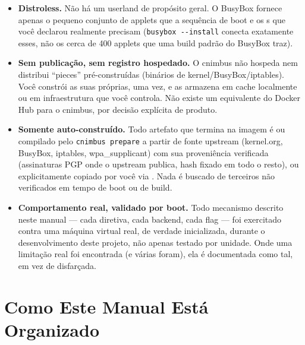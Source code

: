 \documentclass[11pt,letterpaper]{report}
\newcommand{\dashfix}[1]{\StrSubstitute{#1}{--}{-{}-}}
\newcommand{\dir}[1]{\texttt{\textbf{\dashfix{#1}}}}
\begin{document}
\begin{itemize}
  \item \textbf{Distroless.} Não há um userland de propósito geral.
    O BusyBox fornece apenas o pequeno conjunto de applets que a
    sequência de boot e os \dir{SERVICE}s que você declarou realmente
    precisam (\texttt{busybox -{}-install} conecta exatamente esses,
    não os cerca de 400 applets que uma build padrão do BusyBox traz).
  \item \textbf{Sem publicação, sem registro hospedado.} O cnimbus não
    hospeda nem distribui ``pieces'' pré-construídas (binários de
    kernel/BusyBox/iptables). Você constrói as suas próprias, uma vez,
    e as armazena em cache localmente ou em infraestrutura que você
    controla. Não existe um equivalente do Docker Hub para o cnimbus,
    por decisão explícita de produto.
  \item \textbf{Somente auto-construído.} Todo artefato que termina na
    imagem é ou compilado pelo \texttt{cnimbus prepare} a partir de
    fonte upstream (kernel.org, BusyBox, iptables, wpa\_supplicant) com
    sua proveniência verificada (assinaturas PGP onde o upstream
    publica, hash fixado em todo o resto), ou explicitamente copiado
    por você via \dir{COPY}. Nada é buscado de terceiros não
    verificados em tempo de boot ou de build.
  \item \textbf{Comportamento real, validado por boot.} Todo mecanismo
    descrito neste manual --- cada diretiva, cada backend, cada flag
    --- foi exercitado contra uma máquina virtual real, de verdade
    inicializada, durante o desenvolvimento deste projeto, não apenas
    testado por unidade. Onde uma limitação real foi encontrada (e
    várias foram), ela é documentada como tal, em vez de disfarçada.
\end{itemize}

\section{Como Este Manual Está Organizado}
\end{document}
